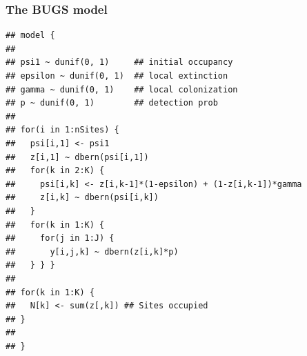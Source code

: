 \documentclass[color=usenames,dvipsnames]{beamer}\usepackage[]{graphicx}\usepackage[]{color}
\makeatletter
\newenvironment{kframe}{%
 \def\at@end@of@kframe{}%
 \ifinner\ifhmode%
  \def\at@end@of@kframe{\end{minipage}}%
  \begin{minipage}{\columnwidth}%
 \fi\fi%
 \def\FrameCommand##1{\hskip\@totalleftmargin \hskip-\fboxsep
 \colorbox{shadecolor}{##1}\hskip-\fboxsep
     \hskip-\linewidth \hskip-\@totalleftmargin \hskip\columnwidth}%
 \MakeFramed {\advance\hsize-\width
   \@totalleftmargin\z@ \linewidth\hsize
   \@setminipage}}%
 {\par\unskip\endMakeFramed%
 \at@end@of@kframe}
\newenvironment{knitrout}{}{} %
\makeatother
\begin{document}
\begin{frame}[fragile]
  \frametitle{The BUGS model}
\begin{knitrout}\scriptsize
{}\color{fgcolor}\begin{kframe}
\begin{verbatim}
## model {
## 
## psi1 ~ dunif(0, 1)     ## initial occupancy
## epsilon ~ dunif(0, 1)  ## local extinction
## gamma ~ dunif(0, 1)    ## local colonization
## p ~ dunif(0, 1)        ## detection prob
## 
## for(i in 1:nSites) {
##   psi[i,1] <- psi1
##   z[i,1] ~ dbern(psi[i,1])
##   for(k in 2:K) {
##     psi[i,k] <- z[i,k-1]*(1-epsilon) + (1-z[i,k-1])*gamma
##     z[i,k] ~ dbern(psi[i,k])
##   }
##   for(k in 1:K) {
##     for(j in 1:J) {
##       y[i,j,k] ~ dbern(z[i,k]*p)
##   } } }
## 
## for(k in 1:K) {
##   N[k] <- sum(z[,k]) ## Sites occupied
## }
## 
## }
\end{verbatim}
\end{kframe}
\end{knitrout}
\end{frame}
\end{document}
